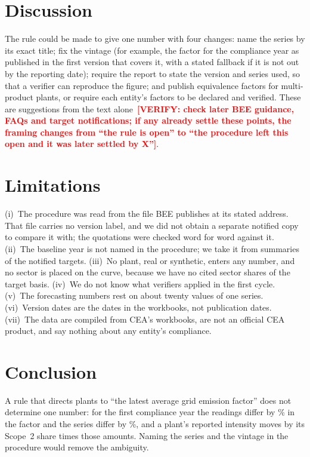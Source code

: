 \documentclass[conference]{IEEEtran}
\newcommand{\verify}[1]{\textcolor{red}{\textbf{[VERIFY: #1]}}}
\begin{document}
\section{Discussion}
The rule could be made to give one number with four changes: name the series by its exact title; fix the vintage (for example, the factor for the compliance year as published in the first version that covers it, with a stated fallback if it is not out by the reporting date); require the report to state the version and series used, so that a verifier can reproduce the figure; and publish equivalence factors for multi-product plants, or require each entity's factors to be declared and verified. These are suggestions from the text alone~\verify{check later BEE guidance, FAQs and target notifications; if any already settle these points, the framing changes from ``the rule is open'' to ``the procedure left this open and it was later settled by X''}.

\section{Limitations}
(i)~The procedure was read from the file BEE publishes at its stated address. That file carries no version label, and we did not obtain a separate notified copy to compare it with; the quotations were checked word for word against it. (ii)~The baseline year is not named in the procedure; we take it from summaries of the notified targets. (iii)~No plant, real or synthetic, enters any number, and no sector is placed on the curve, because we have no cited sector shares of the target basis. (iv)~We do not know what verifiers applied in the first cycle. (v)~The forecasting numbers rest on about twenty values of one series. (vi)~Version dates are the dates in the workbooks, not publication dates. (vii)~The data are compiled from CEA's workbooks, are not an official CEA product, and say nothing about any entity's compliance.

\section{Conclusion}
A rule that directs plants to ``the latest average grid emission factor'' does not determine one number: for the first compliance year the readings differ by \gapReadings{}\% in the factor and the series differ by \spreadTwoTwo{}\%, and a plant's reported intensity moves by its Scope~2 share times those amounts. Naming the series and the vintage in the procedure would remove the ambiguity.
\end{document}

